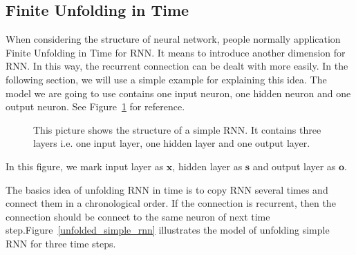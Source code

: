 \documentclass[officiallayout]{tktla}
\begin{document}
\subsection{Finite Unfolding in Time}
When considering the structure of neural network, people normally application Finite Unfolding in Time for RNN. It means to introduce another dimension for RNN. In this way, the recurrent connection can be dealt with more easily.  In the following section, we will use a simple example for explaining this idea. The model we are going to use contains one input neuron, one hidden neuron and one output neuron. See Figure~\ref{simple_rnn} for reference.
\begin{figure}[h!]
  \centering

  \caption{This picture shows the structure of a simple RNN. It contains three layers i.e. one input layer, one hidden layer and one output layer.}\label{simple_rnn}
\end{figure}

In this figure, we mark input layer as $\mathbf{x}$, hidden layer as $\mathbf{s}$ and output layer as $\mathbf{o}$.

The basics idea of unfolding RNN in time is to copy RNN several times and connect them in a chronological order. If the connection is recurrent, then the connection should be connect to the same neuron of next time step.Figure~\ref{unfolded_simple_rnn} illustrates the model of unfolding simple RNN  for three time steps.
\end{document}
